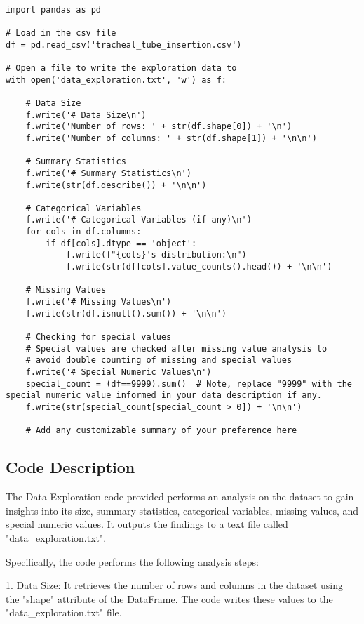 \documentclass[11pt]{article}
\begin{document}
\begin{verbatim}

import pandas as pd

# Load in the csv file
df = pd.read_csv('tracheal_tube_insertion.csv')

# Open a file to write the exploration data to 
with open('data_exploration.txt', 'w') as f:

    # Data Size
    f.write('# Data Size\n')
    f.write('Number of rows: ' + str(df.shape[0]) + '\n')
    f.write('Number of columns: ' + str(df.shape[1]) + '\n\n')

    # Summary Statistics
    f.write('# Summary Statistics\n')
    f.write(str(df.describe()) + '\n\n')

    # Categorical Variables
    f.write('# Categorical Variables (if any)\n')
    for cols in df.columns:
        if df[cols].dtype == 'object':
            f.write(f"{cols}'s distribution:\n")
            f.write(str(df[cols].value_counts().head()) + '\n\n')

    # Missing Values
    f.write('# Missing Values\n')
    f.write(str(df.isnull().sum()) + '\n\n')

    # Checking for special values
    # Special values are checked after missing value analysis to 
    # avoid double counting of missing and special values
    f.write('# Special Numeric Values\n')
    special_count = (df==9999).sum()  # Note, replace "9999" with the special numeric value informed in your data description if any.
    f.write(str(special_count[special_count > 0]) + '\n\n')  
          
    # Add any customizable summary of your preference here

\end{verbatim}

\subsection{Code Description}

The Data Exploration code provided performs an analysis on the dataset to gain insights into its size, summary statistics, categorical variables, missing values, and special numeric values. It outputs the findings to a text file called "data\_exploration.txt".

Specifically, the code performs the following analysis steps:

1. Data Size: It retrieves the number of rows and columns in the dataset using the "shape" attribute of the DataFrame. The code writes these values to the "data\_exploration.txt" file.
\end{document}
